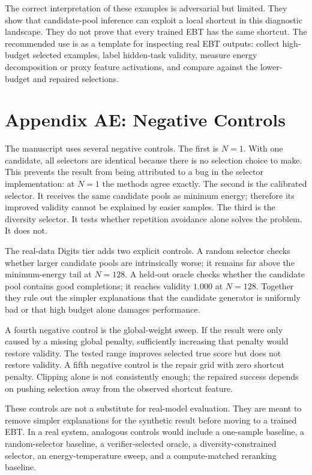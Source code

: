 \documentclass{article}
\begin{document}
The correct interpretation of these examples is adversarial but limited. They
show that candidate-pool inference can exploit a local shortcut in this
diagnostic landscape. They do not prove that every trained EBT has the same
shortcut. The recommended use is as a template for inspecting real EBT
outputs: collect high-budget selected examples, label hidden-task validity,
measure energy decomposition or proxy feature activations, and compare against
the lower-budget and repaired selections.

\section*{Appendix AE: Negative Controls}

The manuscript uses several negative controls. The first is $N=1$.
With one candidate, all selectors are identical because there is no selection
choice to make. This prevents the result from being attributed to a bug in the
selector implementation: at $N=1$ the methods agree exactly. The second is the
calibrated selector. It receives the same candidate pools as minimum energy;
therefore its improved validity cannot be explained by easier samples. The
third is the diversity selector. It tests whether repetition avoidance alone
solves the problem. It does not.

The real-data Digits tier adds two explicit controls. A random selector checks
whether larger candidate pools are intrinsically worse; it remains far above
the minimum-energy tail at $N=128$. A held-out oracle checks whether the
candidate pool contains good completions; it reaches validity $1.000$ at
$N=128$. Together they rule out the simpler explanations that the candidate
generator is uniformly bad or that high budget alone damages performance.

A fourth negative control is the global-weight sweep. If the result were only
caused by a missing global penalty, sufficiently increasing that penalty would
restore validity. The tested range improves selected true score but does not
restore validity. A fifth negative control is the repair grid with zero
shortcut penalty. Clipping alone is not consistently enough; the repaired
success depends on pushing selection away from the observed shortcut feature.

These controls are not a substitute for real-model evaluation. They are meant
to remove simpler explanations for the synthetic result before moving to a
trained EBT. In a real system, analogous controls would include a one-sample
baseline, a random-selector baseline, a verifier-selected oracle, a
diversity-constrained selector, an energy-temperature sweep, and a
compute-matched reranking baseline.
\end{document}
